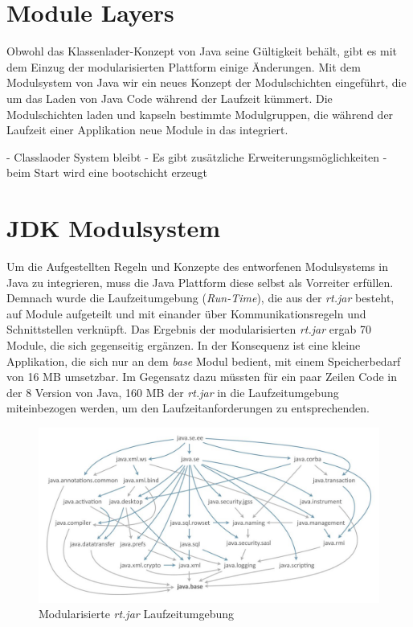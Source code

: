   \section{Module Layers} \label{sec:module_layers}
   Obwohl das Klassenlader-Konzept von Java seine Gültigkeit behält, gibt es mit dem Einzug der modularisierten Plattform einige Änderungen. Mit dem Modulsystem von Java wir ein neues Konzept der Modulschichten eingeführt, die um das Laden von Java Code während der Laufzeit kümmert. Die Modulschichten  laden und kapseln bestimmte Modulgruppen, die während der Laufzeit einer Applikation neue Module in das integriert. 

- Classlaoder System bleibt 
-  Es gibt zusätzliche Erweiterungsmöglichkeiten 
- beim Start wird eine bootschicht erzeugt 

\section{JDK Modulsystem} \label{sec:modular_java_base}
  Um die Aufgestellten Regeln und Konzepte des entworfenen Modulsystems in Java zu integrieren, muss die Java Plattform diese selbst als Vorreiter erfüllen. \bigbreak
  Demnach wurde die Laufzeitumgebung (\textit{Run-Time}), die aus der \textit{rt.jar} besteht, auf Module aufgeteilt und mit einander über Kommunikationsregeln und Schnittstellen verknüpft. Das Ergebnis der modularisierten \textit{rt.jar} ergab 70 Module, die sich gegenseitig ergänzen. \newline
  In der Konsequenz ist eine kleine Applikation, die sich nur an dem \textit{base} Modul bedient, mit einem Speicherbedarf von 16 MB umsetzbar. Im Gegensatz dazu müssten für ein paar Zeilen Code in der 8 Version von Java, 160 MB der \textit{rt.jar} in die Laufzeitumgebung miteinbezogen werden, um den Laufzeitanforderungen zu entsprechenden.\bigbreak
  \begin{figure}[h!]
   \centering
   \includegraphics[width=\textwidth]{material/images/moduleGraph.jpg}
   \caption{Modularisierte \textit{rt.jar} Laufzeitumgebung \cite{modGraph}}
   \label{fig:jdk}
  \end{figure}
